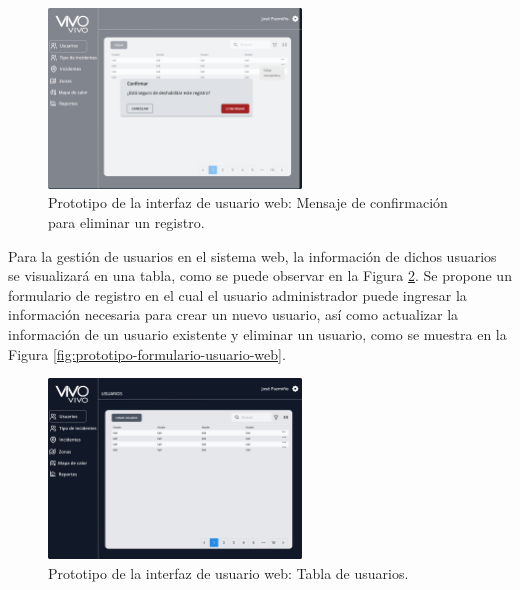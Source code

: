 \begin{figure}[H]
    \centering
    \includegraphics[width=0.6\textwidth]{chapters/III-resultados-y-discusion/resources/images/prototipo-mensaje-eliminar-web.png}
    \caption{Prototipo de la interfaz de usuario web: Mensaje de confirmación para eliminar un registro.}
    \label{fig:prototipo-mensaje-eliminar-web}
\end{figure}

Para la gestión de usuarios en el sistema web, la información de dichos usuarios se visualizará en una tabla, como se puede observar en la Figura
\ref{fig:prototipo-tabla-usuarios-web}. Se propone un formulario de registro en el cual el usuario administrador puede ingresar la información
necesaria para crear un nuevo usuario, así como actualizar la información de un usuario existente y eliminar un usuario, como se muestra en la Figura
\ref{fig:prototipo-formulario-usuario-web}.

\begin{figure}[H]
    \centering
    \includegraphics[width=0.6\textwidth]{chapters/III-resultados-y-discusion/resources/images/prototipo-tabla-usuarios-web.png}
    \caption{Prototipo de la interfaz de usuario web: Tabla de usuarios.}
    \label{fig:prototipo-tabla-usuarios-web}
\end{figure}

